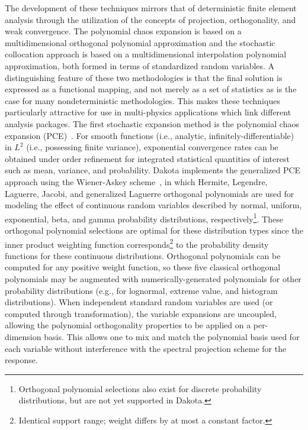 The development of these techniques mirrors that of deterministic
finite element analysis through the utilization of the concepts of
projection, orthogonality, and weak convergence. The polynomial chaos
expansion is based on a multidimensional orthogonal polynomial
approximation and the stochastic collocation approach is based on a
multidimensional interpolation polynomial approximation, both formed
in terms of standardized random variables. A distinguishing feature of
these two methodologies is that the final solution is expressed as a
functional mapping, and not merely as a set of statistics as is the
case for many nondeterministic methodologies.  This makes these
techniques particularly attractive for use in multi-physics
applications which link different analysis packages.  The first
stochastic expansion method is the polynomial chaos expansion
(PCE)~\cite{Gha99,Gha91}. For smooth functions (i.e.,
analytic, infinitely-differentiable) in $L^2$ (i.e., possessing finite
variance), exponential convergence rates can be obtained under order
refinement for integrated statistical quantities of interest such as
mean, variance, and probability. Dakota implements the generalized
PCE approach using the Wiener-Askey
scheme~\cite{XiuKarn02}, in which Hermite, Legendre, Laguerre, Jacobi,
and generalized Laguerre orthogonal polynomials are used for modeling
the effect of continuous random variables described by normal,
uniform, exponential, beta, and gamma probability distributions,
respectively\footnote{Orthogonal polynomial selections also exist for
  discrete probability distributions, but are not yet supported in
  Dakota.}. These orthogonal polynomial selections are optimal for
these distribution types since the inner product weighting function
corresponds\footnote{Identical support range; weight differs by at
  most a constant factor.} to the probability density functions for
these continuous distributions. Orthogonal polynomials can be computed
for any positive weight function, so these five classical orthogonal
polynomials may be augmented with numerically-generated polynomials
for other probability distributions (e.g., for lognormal, extreme
value, and histogram distributions).  When independent standard random
variables are used (or computed through transformation), the variable
expansions are uncoupled, allowing the polynomial orthogonality
properties to be applied on a per-dimension basis. This allows one to
mix and match the polynomial basis used for each variable without
interference with the spectral projection scheme for the response.

